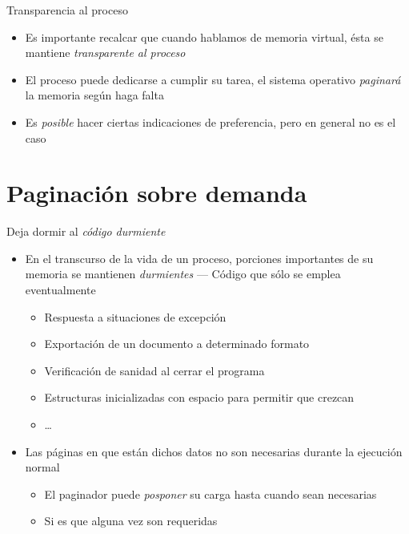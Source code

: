 \documentclass[presentation]{beamer}
\begin{document}
\begin{frame}[label={sec:org313f7b1}]{Transparencia al proceso}
\begin{itemize}
\item Es importante recalcar que cuando hablamos de memoria virtual, ésta
se mantiene \emph{transparente al proceso}
\item El proceso puede dedicarse a cumplir su tarea, el sistema operativo
\emph{paginará} la memoria según haga falta
\item Es \emph{posible} hacer ciertas indicaciones de preferencia, pero en
general no es el caso
\end{itemize}
\end{frame}

\section{Paginación sobre demanda}
\label{sec:org1dfbb89}

\begin{frame}[label={sec:org1392741}]{Deja dormir al \emph{código durmiente}}
\begin{itemize}
\item En el transcurso de la vida de un proceso, porciones importantes de
su memoria se mantienen \emph{durmientes} — Código que sólo se emplea
eventualmente
\begin{itemize}
\item Respuesta a situaciones de excepción
\item Exportación de un documento a determinado formato
\item Verificación de sanidad al cerrar el programa
\item Estructuras inicializadas con espacio para permitir que crezcan
\item \ldots{}
\end{itemize}
\item Las páginas en que están dichos datos no son necesarias durante la
ejecución normal
\begin{itemize}
\item El paginador puede \emph{posponer} su carga hasta cuando sean necesarias
\item Si es que alguna vez son requeridas
\end{itemize}
\end{itemize}
\end{frame}
\end{document}
